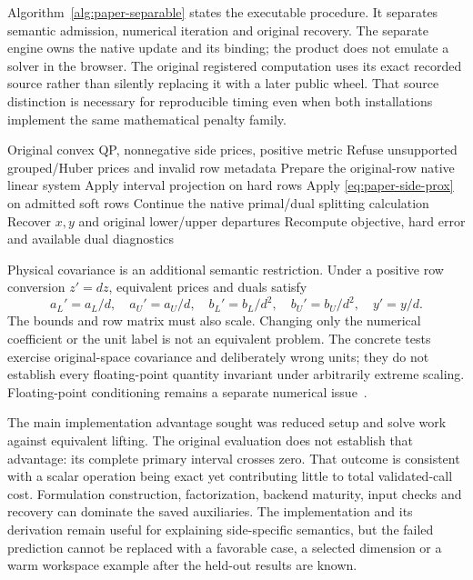 Algorithm~\ref{alg:paper-separable} states the executable procedure. It
separates semantic admission, numerical iteration and original recovery.
The separate engine owns the native update and its binding; the product
does not emulate a solver in the browser. The original registered
computation uses its exact recorded source rather than silently replacing
it with a later public wheel. That source distinction is necessary for
reproducible timing even when both installations implement the same
mathematical penalty family.

\begin{algorithm}[htbp]
\caption{Execute side-specific interval updates on the original row system, preserve hard policy, and return original-space quantities for independent objective and feasibility evaluation.}\label{alg:paper-separable}
\begin{algorithmic}[1]
\Require Original convex QP, nonnegative side prices, positive metric
\State Refuse unsupported grouped/Huber prices and invalid row metadata
\State Prepare the original-row native linear system
\State Apply interval projection on hard rows
\State Apply \eqref{eq:paper-side-prox} on admitted soft rows
\State Continue the native primal/dual splitting calculation
\EndWhile
\State Recover $x,y$ and original lower/upper departures
\State Recompute objective, hard error and available dual diagnostics
\end{algorithmic}
\end{algorithm}

Physical covariance is an additional semantic restriction. Under a
positive row conversion $z'=dz$, equivalent prices and duals satisfy
\begin{equation}\label{eq:paper-side-covariance}
 a_L'=a_L/d,\quad a_U'=a_U/d,\quad
 b_L'=b_L/d^2,\quad b_U'=b_U/d^2,\quad y'=y/d.
\end{equation}
The bounds and row matrix must also scale. Changing only the numerical
coefficient or the unit label is not an equivalent problem. The concrete
tests exercise original-space covariance and deliberately wrong units;
they do not establish every floating-point quantity invariant under
arbitrarily extreme scaling. Floating-point conditioning remains a
separate numerical issue~\cite{higham,knight}.

The main implementation advantage sought was reduced setup and solve
work against equivalent lifting. The original evaluation does not
establish that advantage: its complete primary interval crosses zero.
That outcome is consistent with a scalar operation being exact yet
contributing little to total validated-call cost. Formulation construction,
factorization, backend maturity, input checks and recovery can dominate
the saved auxiliaries. The implementation and its derivation remain
useful for explaining side-specific semantics, but the failed prediction
cannot be replaced with a favorable case, a selected dimension or a warm
workspace example after the held-out results are known.

